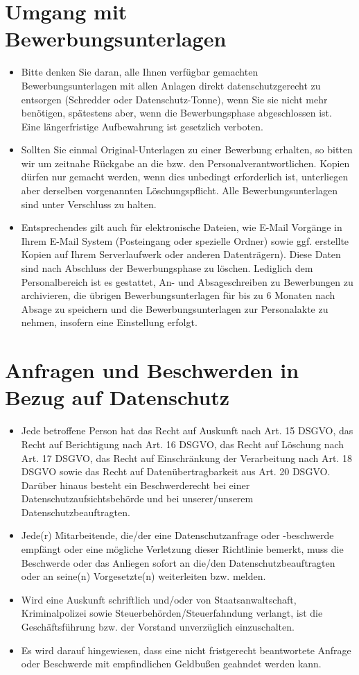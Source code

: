 \documentclass[a4paper, fontsize=11pt]{scrartcl}
\begin{document}
\section{Umgang mit Bewerbungsunterlagen}
\begin{itemize}
  \item Bitte denken Sie daran, alle Ihnen verfügbar gemachten Bewerbungsunterlagen mit allen Anlagen direkt datenschutzgerecht zu entsorgen (Schredder oder Datenschutz-Tonne), wenn Sie sie nicht mehr benötigen, spätestens aber, wenn die Bewerbungsphase abgeschlossen ist. Eine längerfristige Aufbewahrung ist gesetzlich verboten.
  \item Sollten Sie einmal Original-Unterlagen zu einer Bewerbung erhalten, so bitten wir um zeitnahe Rückgabe an die bzw. den Personalverantwortlichen. Kopien dürfen nur gemacht werden, wenn dies unbedingt erforderlich ist, unterliegen aber derselben vorgenannten Löschungspflicht. Alle Bewerbungsunterlagen sind unter Verschluss zu halten.
  \item Entsprechendes gilt auch für elektronische Dateien, wie E-Mail Vorgänge in Ihrem E-Mail System (Posteingang oder spezielle Ordner) sowie ggf. erstellte Kopien auf Ihrem Serverlaufwerk oder anderen Datenträgern). Diese Daten sind nach Abschluss der Bewerbungsphase zu löschen. Lediglich dem Personalbereich ist es gestattet, An- und Absageschreiben zu Bewerbungen zu archivieren, die übrigen Bewerbungsunterlagen für bis zu 6 Monaten nach Absage zu speichern und die Bewerbungsunterlagen zur Personalakte zu nehmen, insofern eine Einstellung erfolgt.
\end{itemize}

\section{Anfragen und Beschwerden in Bezug auf Datenschutz}
\begin{itemize}
  \item Jede betroffene Person hat das Recht auf Auskunft nach Art. 15 DSGVO, das Recht auf Berichtigung nach Art. 16 DSGVO, das Recht auf Löschung nach Art. 17 DSGVO, das Recht auf Einschränkung der Verarbeitung nach Art. 18 DSGVO sowie das Recht auf Datenübertragbarkeit aus Art. 20 DSGVO. Darüber hinaus besteht ein Beschwerderecht bei einer Datenschutzaufsichtsbehörde und bei unserer/unserem Datenschutzbeauftragten.
  \item Jede(r) Mitarbeitende, die/der eine Datenschutzanfrage oder -beschwerde empfängt oder eine mögliche Verletzung dieser Richtlinie bemerkt, muss die Beschwerde oder das Anliegen sofort an die/den Datenschutzbeauftragten oder an seine(n) Vorgesetzte(n) weiterleiten bzw. melden.
  \item Wird eine Auskunft schriftlich und/oder von Staatsanwaltschaft, Kriminalpolizei sowie Steuerbehörden/Steuerfahndung verlangt, ist die Geschäftsführung bzw. der Vorstand unverzüglich einzuschalten.
  \item Es wird darauf hingewiesen, dass eine nicht fristgerecht beantwortete Anfrage oder Beschwerde mit empfindlichen Geldbußen geahndet werden kann.
\end{itemize}
\end{document}
